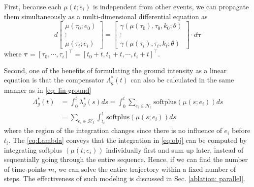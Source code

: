 First, because each $\mu(t; e_i)$ is independent from other events, we can propagate them simultaneously as a multi-dimensional differential equation as
\begin{equation}
    d 
    \begin{bmatrix}
        \mu(\tau_0 ;e_0) \\ \vdots \\ \mu(\tau_i;e_i)
    \end{bmatrix}
    = 
    \begin{bmatrix}
        \gamma(\mu(\tau_0), \tau_0, k_0;\theta) \\ \vdots \\ \gamma(\mu(\tau_i), \tau_i, k_i; \theta)
    \end{bmatrix}
    \cdot d \boldsymbol{\tau}
    \label{eq: train_parallel}
\end{equation}
where $ \boldsymbol{\tau} =[\tau_0, \cdots, \tau_i] ^\top = [t_0 + t, t_1 + t, \cdots, t_i + t] ^ \top$. 

Second, one of the benefits of formulating the ground intensity as a linear equation is that 
the compensator $\Lambda^* _g(t)$ can also be calculated in the same manner as in \eqref{eq: lin-ground}
\begin{align}
    \Lambda^* _g (t)  & = \int _0 ^t \lambda_g ^* (s) ds = \int_0 ^t \sum _{e_i \in \mathcal{H}_{t}} \text{softplus} (\mu  (s; e_i)) ds \\    
    & = \sum_{e_i \in \mathcal{H}_{t}} \int _{t_i} ^t \text{softplus}( \mu (s; e_i)) ds
    \label{eq:Lambda}
\end{align}
where the region of the integration changes since there is no influence of $e_i$ before $t_i$.
The \eqref{eq:Lambda} conveys that the integration in \eqref{eq:obj} can be computed by integrating softplus
$(\mu(t;e_i))$ individually first and sum up later, 
instead of sequentially going through the entire sequence. 
Hence, if we can find the number of time-points $m$, we can solve the entire trajectory within a fixed number of steps. The effectiveness of such modeling is discussed in Sec. \ref{ablation: parallel}.